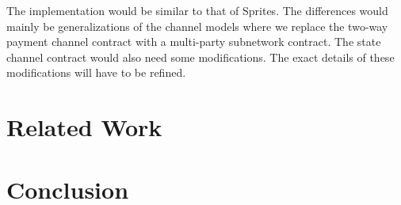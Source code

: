 \documentclass[12pt]{article}
\begin{document}
The implementation would be similar to that of Sprites. The differences would mainly be generalizations of the channel models where we replace the two-way payment channel contract with a multi-party subnetwork contract. The state channel contract would also need some modifications. The exact details of these modifications will have to be refined.

\section{Related Work}
\section{Conclusion}



\end{document}
